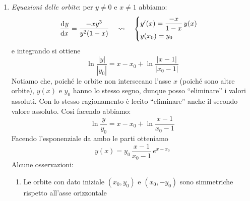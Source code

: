 {\begin{enumerate}
    Se $ x=0 $ abbiamo \[
        \begin{cases}
            x'=y^{2}>0\\ 
            y'=0
        \end{cases}
    \]
    \begin{figure}[H]
        \begin{center}
        \end{center}
        \caption{Punti con tangenti verticali e orizzontali per l'esempio }
    \end{figure}
    \item \emph{Equazioni delle orbite}: per $ y\neq 0 $ e $ x\neq 1 $ abbiamo: \begin{equation}
        \dod{y}{x}=\frac{-xy^{3}}{y^{2}(1-x)}\quad\leadsto\quad \begin{cases}
            y'(x)=\displaystyle\frac{-x}{1-x}\,y(x) \label{eq:diff:orb}\\ 
            y(x_0)=y_0
        \end{cases}
    \end{equation}e integrando si ottiene \[
        \ln\frac{|y|}{|y_0|} = x-x_0 + \ln\frac{|x-1|}{|x_0-1|}
    \]Notiamo che, poiché le orbite non intersecano l'asse $ x $ (poiché sono altre orbite), $ y(x) $ e $ y_0 $ hanno lo stesso segno, dunque posso ``eliminare'' i valori assoluti. Con lo stesso ragionamento è lecito ``eliminare'' anche il secondo valore assoluto. Cosi facendo abbiamo: \[
        \ln\frac{y}{y_0} = x-x_0 + \ln\frac{x-1}{x_0-1}
    \]Facendo l'esponenziale da ambo le parti otteniamo \[
        y(x)= y_0\,\frac{x-1}{x_0-1}\,e^{x-x_0}
    \]Alcune osservazioni: \begin{enumerate}
        \item Le orbite con dato iniziale $ (x_0,y_0) $ e $ (x_0,-y_0) $ sono simmetriche rispetto all'asse orizzontale 
        

\end{enumerate}
\end{enumerate}}
